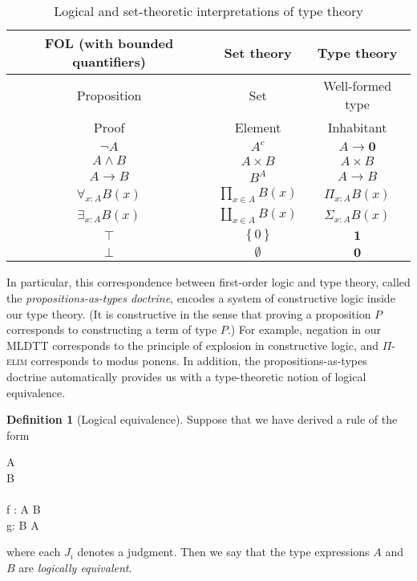 \documentclass[10pt,letterpaper,cm]{nupset}
\theoremstyle{definition}
\newtheorem{definition}{Definition}[subsection]
\theoremstyle{theorem}
\theoremstyle{remark}
\newcommand{\0}{\mathbf{0}}
\newcommand{\1}{\mathbf{1}}
\newcommand{\2}{\mathbf{2}}
\DeclareMathOperator{\type}{\mathtt{type}}
\newcommand{\bmp}{\begin{mathpar}}
\newcommand{\emp}{\end{mathpar}}
\begin{document}
\begin{table}[h!]
\centering
\caption{Logical and set-theoretic interpretations of type theory}
\label{table:2}
\begin{tabular}{||c c c||} 
 \hline
 FOL (with bounded quantifiers) & Set theory & Type theory \\ [0.5ex] 
 \hline\hline
 Proposition &  Set & Well-formed type \\ 
   Proof        &  Element  & Inhabitant  \\
 $\neg{A}$ &  $A^c$  &   $A \to \0$ \\
 $A \land B$ & $A \times B$ & $A \times B$  \\ 
 $A \to B$ & $B^A$ &  $A \to B$  \\
 $\forall_{x:A}B(x)$ & $\prod_{x\in A}B(x)$ &  $\Pi_{x:A}B(x)$  \\
 $\exists_{x:A} B(x)$ & $\coprod_{x\in A}B(x)$ & $\Sigma_{x:A}B(x)$ \\ 
  $\top$    & $\left\{0\right\}$    & $\1$ \\
  $\bot$    & $\emptyset$  & $\0$ \\ [1ex] 
 \hline
\end{tabular}
\end{table}

In particular, this correspondence between first-order logic and type theory, called the \textit{propositions-as-types doctrine}, encodes a system of constructive logic inside our  type theory. (It is constructive in the sense that proving a proposition $P$ corresponds to constructing a term of type $P$.) For example, negation in our MLDTT corresponds to the principle of explosion in constructive logic, and $\Pi$-\textsc{elim} corresponds to modus ponens. In addition, the propositions-as-types doctrine automatically provides us with a type-theoretic notion of logical equivalence.


\begin{definition}[Logical equivalence]
Suppose that we have derived  a rule of the form
\bmp 
{}
{\Gamma \vdash A \type \\ \Gamma  \vdash B \type \\\\ \Gamma \vdash  f : A \to B \\ \Gamma \vdash g: B \to A}
\emp where each $J_i$ denotes a judgment. 
 Then we say that the type expressions $A$ and $B$ are \textit{logically equivalent}. 
\end{definition}
\end{document}
